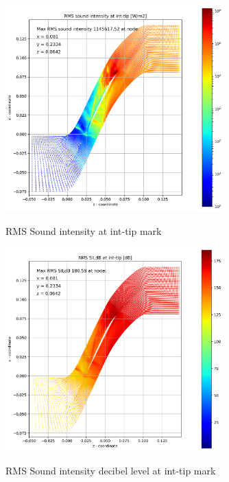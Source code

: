 \begin{figure}[ht]
  \centering
  \includegraphics[width=0.75\textwidth]{Figures/int-tip-rms-sil.png} \label{int-tip-rms-sil}
  \caption{RMS Sound intensity at int-tip mark}
  
  \vspace*{\floatsep}%

  \includegraphics[width=0.75\textwidth]{Figures/int-tip-rms-sildb.png} \label{int-tip-rms-sildb}
  \caption{RMS Sound intensity decibel level at int-tip mark}
\end{figure}
